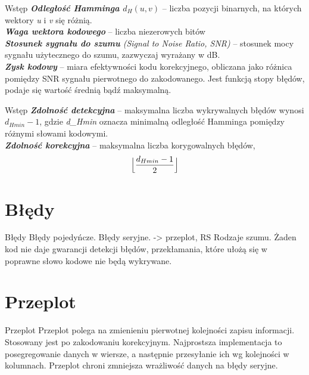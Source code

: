 \documentclass[12pt]{beamer}
\begin{document}
\begin{frame}{Wstęp}
	\emph{\textbf{Odległość Hamminga $d_H(u, v)$}} -- liczba pozycji binarnych, na których wektory \emph{u} i \emph{v} się różnią.\\
	\emph{\textbf{Waga wektora kodowego}} -- liczba niezerowych bitów\\

	\emph{\textbf{Stosunek sygnału do szumu} (Signal to Noise Ratio, SNR)} -- stosunek mocy sygnału użytecznego do szumu, zazwyczaj wyrażany w dB.\\
	\emph{\textbf{Zysk kodowy}} -- miara efektywności kodu korekcyjnego, obliczana jako różnica pomiędzy SNR sygnału pierwotnego do zakodowanego. Jest funkcją stopy błędów, podaje się wartość średnią bądź maksymalną.
\end{frame}

\begin{frame}{Wstęp}
	\emph{\textbf{Zdolność detekcyjna}} -- maksymalna liczba wykrywalnych błędów wynosi $d_{Hmin}-1$, gdzie \emph{d_Hmin} oznacza minimalną odległość Hamminga pomiędzy różnymi słowami kodowymi.\\
	\emph{\textbf{Zdolność korekcyjna}} -- maksymalna liczba korygowalnych błędów, 
	\begin{equation}
\Bigl\lfloor \frac{d_{Hmin}-1}{2} \Bigr\rfloor	
\end{equation}	

	
\end{frame}

\section{Błędy}
\begin{frame}{Błędy}
Błędy pojedyńcze.
Błędy seryjne. -> przeplot, RS
Rodzaje szumu.
Żaden kod nie daje gwarancji detekcji błędów, przekłamania, które ułożą się w poprawne słowo kodowe nie będą wykrywane.
\end{frame}

\section{Przeplot}
\begin{frame}{Przeplot}
Przeplot polega na zmienieniu pierwotnej kolejności zapisu informacji. Stosowany jest po zakodowaniu korekcyjnym. Najprostsza implementacja to posegregowanie danych w wiersze, a następnie przesyłanie ich wg kolejności w kolumnach. Przeplot chroni zmniejsza wrażliwość danych na błędy seryjne.
\end{frame}
\end{document}
